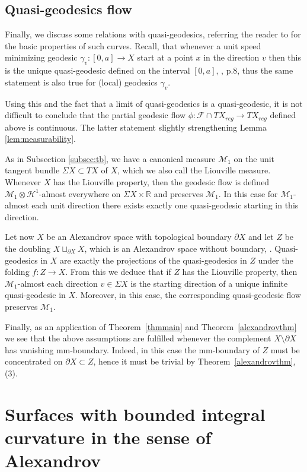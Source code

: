 \documentclass[12pt,leqno,intlimits]{amsart}
\numberwithin{equation}{section}
\theoremstyle{definition}
\theoremstyle{remark}
\newcommand{\tref}[1]{Theorem~\ref{#1}}
\newcommand{\R}{\mathbb{R}}
\def\:{\colon}
\begin{document}
\subsection{Quasi-geodesics flow} \label{subsec:quasi}
Finally, we discuss some relations with quasi-geodesics, referring the reader to \cite{Petsemi} for the basic properties of such curves.
Recall, that whenever a unit speed minimizing geodesic $\gamma _v \:[0,a] \to X$ start at a point $x$ in the direction $v$ then this is the unique quasi-geodesic defined on the interval $[0,a]$, \cite{PP}, p.8, thus the same statement is also true for (local) geodesics $\gamma _v$.

Using this and the fact that a limit of quasi-geodesics is a quasi-geodesic, it is not difficult to conclude that the partial geodesic flow $\phi\:\mathcal F\cap TX_{reg} \to TX_{reg}$ defined above is continuous.
The latter statement slightly strengthening Lemma \ref{lem:measurability}.

As in Subsection \ref{subsec:tb}, we have a canonical measure $\mathcal M _1$ on the unit tangent bundle $\Sigma X \subset TX $ of $X$, which we also call the Liouville measure. Whenever
$X$ has the Liouville property, then the geodesic flow is defined $\mathcal M_1\otimes \mathcal H^1$-almost everywhere on $\Sigma X \times \R$ and preserves $\mathcal M_1$. In this case for $\mathcal M_1$-almost each unit direction there exists exactly one quasi-geodesic starting in this direction.

Let now $X$ be an Alexandrov space with topological boundary $\partial X$ and let $Z$ be the doubling $X\sqcup_{\partial X} X$, which
is an Alexandrov space without boundary, \cite{P2}.
Quasi-geodesics in $X$ are exactly the projections of the quasi-geodesics in $Z$ under
the folding $f\:Z\to X$.
From this we deduce that if $Z$ has the Liouville property, then $\mathcal M_1$-almost each direction $v\in \Sigma X$ is the starting direction of a unique infinite quasi-geodesic in $X$.
Moreover, in this case, the corresponding quasi-geodesic flow preserves $\mathcal M_1$.

Finally, as an application of \tref{thmmain} and \tref{alexandrovthm} we see that the above assumptions are fulfilled whenever the complement $X\setminus\partial X$ has vanishing  mm-boundary. Indeed, in this case the mm-boundary of $Z$ must be concentrated on $\partial X \subset Z$, hence it must be trivial by \tref{alexandrovthm},(3).

\section{Surfaces with bounded integral curvature in the sense of Alexandrov} \label{sec:surface}
\end{document}
